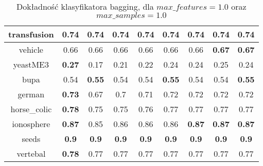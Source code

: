 \begin{table}[H]
\begin{center}
{\begin{tabular}{c|cccccccc}
				\hline%
				transfusion&\textbf{0.74}&\textbf{0.74}&\textbf{0.74}&\textbf{0.74}&\textbf{0.74}&\textbf{0.74}&\textbf{0.74}&\textbf{0.74}\\%
				\hline%
				vehicle&0.66&0.66&0.66&0.66&0.66&0.66&\textbf{0.67}&\textbf{0.67}\\%
				\hline%
				yeastME3&\textbf{0.27}&0.17&0.21&0.22&0.24&0.24&0.25&0.24\\%
				\hline%
				bupa&0.54&\textbf{0.55}&0.54&0.54&\textbf{0.55}&0.54&0.54&\textbf{0.55}\\%
				\hline%
				german&\textbf{0.73}&0.67&0.7&0.71&0.72&0.72&0.72&0.72\\%
				\hline%
				horse\_colic&\textbf{0.78}&0.75&0.75&0.76&0.77&0.77&0.77&0.77\\%
				\hline%
				ionosphere&\textbf{0.87}&0.85&0.86&0.86&0.86&\textbf{0.87}&\textbf{0.87}&\textbf{0.87}\\%
				\hline%
				seeds&\textbf{0.9}&\textbf{0.9}&\textbf{0.9}&\textbf{0.9}&\textbf{0.9}&\textbf{0.9}&\textbf{0.9}&\textbf{0.9}\\%
				\hline%
				vertebal&\textbf{0.78}&0.77&0.77&0.77&0.77&0.77&0.77&0.77\\%
				\hline%
			\end{tabular}}
			\caption{Dokładność klasyfikatora bagging, dla $max\_features = 1.0$ oraz $max\_samples = 1.0$}
			\label{bagging_11}
		\end{center}
\end{table}
